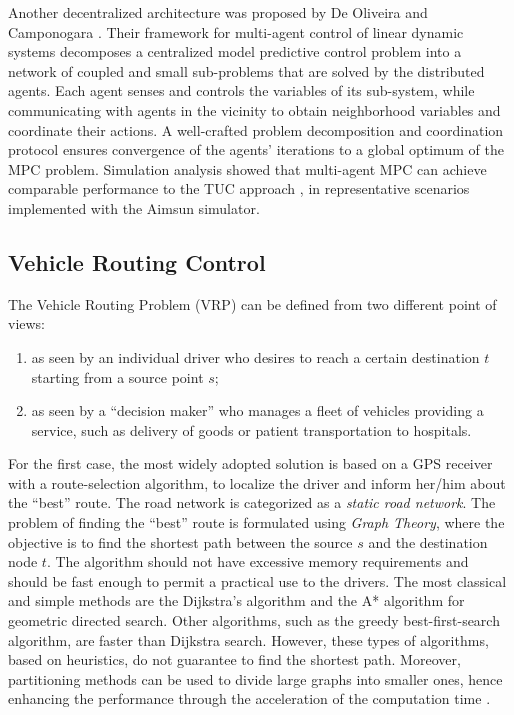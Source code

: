 \documentclass[10pt,onecolumn]{article}
\begin{document}
Another decentralized architecture was proposed by De Oliveira and Camponogara \cite{deOliveira2010}. Their framework for multi-agent control of linear dynamic systems decomposes a centralized model predictive control problem into a network of coupled and small sub-problems that are solved by the distributed agents. 
Each agent senses and controls the variables of its sub-system, while communicating with agents in the vicinity to obtain neighborhood variables and coordinate their actions. A well-crafted problem decomposition and coordination protocol ensures convergence of the agents' iterations to a global optimum of the MPC problem.
Simulation analysis showed that multi-agent MPC can achieve comparable performance to the TUC approach \cite{Diakaki2002}, in representative scenarios implemented with the Aimsun simulator. 


\subsection{Vehicle Routing Control}

The Vehicle Routing Problem (VRP) can be defined from two different point of views: 
\begin{enumerate}
 \item as seen by an individual driver who desires to reach a certain destination $t$ starting from a source point $s$;
 \item as seen by a ``decision maker'' who manages a fleet of vehicles providing a service, such as delivery of goods or patient transportation to hospitals.
\end{enumerate}

For the first case, the most widely adopted solution is based on a GPS receiver with a route-selection algorithm, to localize the driver and inform her/him about the ``best'' route. 
The road network is categorized as a \textit{static road network}. The problem of finding the ``best'' route is formulated using \textit{Graph Theory}, where the objective is to find the shortest path between the source $s$ and the destination node $t$.
The algorithm should not have excessive memory requirements and should be fast enough to permit a practical use to the drivers. 
The most classical and simple methods are the Dijkstra's algorithm and the A* algorithm for geometric directed search. 
Other algorithms, such as the greedy best-first-search algorithm, are faster than Dijkstra search. However, these types of algorithms, based on heuristics, do not guarantee to find the shortest path.
Moreover, partitioning methods can be used to divide large graphs into smaller ones, hence enhancing the performance through the acceleration of the computation time \cite{Mohring2005}.
\end{document}

